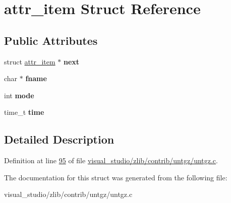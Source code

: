 \hypertarget{structattr__item}{}\section{attr\+\_\+item Struct Reference}
\label{structattr__item}
\subsection*{Public Attributes}
\begin{DoxyCompactItemize}
\item 
\mbox{\label{structattr__item_ae7a229aba50332ac79ab83d15afe3caa}} 
struct \hyperlink{structattr__item}{attr\+\_\+item} $\ast$ {\bfseries next}
\item 
\mbox{\label{structattr__item_a5351f7871d15ea6a640c7087ff6c0ac1}} 
char $\ast$ {\bfseries fname}
\item 
\mbox{\label{structattr__item_a2a7463d7c3b23ae7ca0b83c9863a3f8c}} 
int {\bfseries mode}
\item 
\mbox{\label{structattr__item_a24d9a9df84ea95659d31ee9d16e2b4b1}} 
time\+\_\+t {\bfseries time}
\end{DoxyCompactItemize}


\subsection{Detailed Description}


Definition at line \hyperlink{visual__studio_2zlib_2contrib_2untgz_2untgz_8c_source_l00095}{95} of file \hyperlink{visual__studio_2zlib_2contrib_2untgz_2untgz_8c_source}{visual\+\_\+studio/zlib/contrib/untgz/untgz.\+c}.



The documentation for this struct was generated from the following file\+:\begin{DoxyCompactItemize}
\item 
visual\+\_\+studio/zlib/contrib/untgz/untgz.\+c\end{DoxyCompactItemize}
